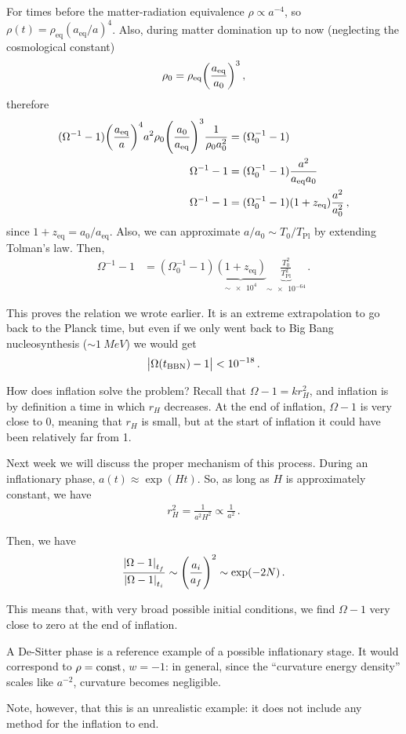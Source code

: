 \documentclass[main.tex]{subfiles}
\begin{document}
For times before the matter-radiation equivalence \(\rho \propto a^{-4}\), so  \(\rho (t) = \rho _{\text{eq}} (a _{\text{eq}} / a)^{4}\). Also, during matter domination up to now (neglecting the cosmological constant)
%
\begin{align}
\rho_0 = \rho _{\text{eq}} \qty(\frac{a _{\text{eq}}}{a_0 })^3
\,,
\end{align}
%
therefore 
%
\begin{align}
(\Omega^{-1} -1) \qty(\frac{a _{\text{eq}}}{a})^{4} a^2 \rho_0 \qty(\frac{a_0 }{a _{\text{eq}}})^{3} \frac{1}{\rho_0 a_0^2} &= (\Omega_0^{-1} - 1)
\\
\Omega^{-1} - 1 &= (\Omega_0^{-1} -1) \frac{a^2}{a _{\text{eq}} a_0 } \\
\Omega^{-1} - 1 &= (\Omega_0^{-1} -1) (1 + z _{\text{eq}}) \frac{a^2}{a_0^2}
\,,
\end{align}
%
since \(1 + z _{\text{eq}} = a_0 / a _{\text{eq}}\). Also, we can approximate \(a/a_0 \sim T_0 / T _{\text{Pl}}\) by extending Tolman's law. 
Then, 
%
\begin{align}
\Omega^{-1} - 1 &= (\Omega_0^{-1} -1) \underbrace{(1 + z _{\text{eq}})}_{\sim \num{e4}} \underbrace{\frac{T_0 ^2}{T _{\text{Pl}}^2}}_{\sim \num{e-64}}
\,.
\end{align}

This proves the relation we wrote earlier. It is an extreme extrapolation to go back to the Planck time, but even if we only went back to Big Bang nucleosynthesis (\(\sim \SI{1}{MeV}\)) we would get 
%
\begin{align}
\abs{\Omega (t _{\text{BBN}}) - 1 } < \num{e-18}
\,.
\end{align}

How does inflation solve the problem?
Recall that \(\Omega -1  = k r_H^2\), and inflation is by definition a time in which \(r_H\) decreases. 
At the end of inflation, \(\Omega - 1\) is very close to 0, meaning that \(r_H\) is small, but at the start of inflation it could have been relatively far from 1. 

Next week we will discuss the proper mechanism of this process.
During an inflationary phase, \(a (t) \approx \exp(Ht)\). So, as long as \(H\) is approximately constant, we have
%
\begin{align}
r_H^2 = \frac{1}{a^2 H^2} \propto \frac{1}{a^2}
\,.
\end{align}

Then, we have 
%
\begin{align}
\frac{\abs{\Omega -1}_{t_f}}{\abs{\Omega - 1}_{t_i}} \sim \qty(\frac{a_i}{a_f})^{2} \sim \exp(- 2N)
\,.
\end{align}

This means that, with very broad possible initial conditions, we find \(\Omega -1\) very close to zero at the end of inflation. 

A De-Sitter phase is a reference example of a possible inflationary stage. 
It would correspond to \(\rho = \text{const}\), \(w = -1\): in general, since the ``curvature energy density'' scales like \(a^{-2}\), curvature becomes negligible. 

Note, however, that this is an unrealistic example: it does not include any method for the inflation to end. 
\end{document}
